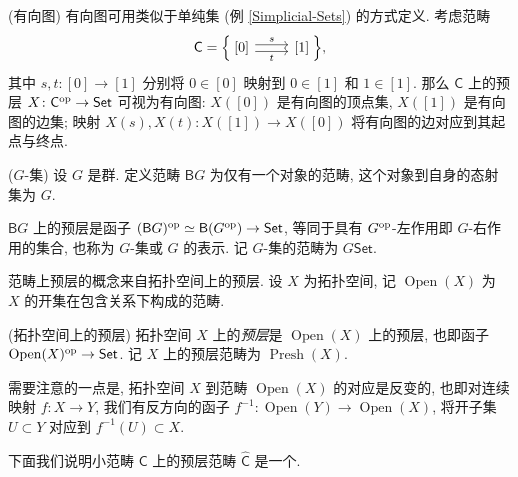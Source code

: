 \begin{example}
    {(有向图)}
    有向图可用类似于单纯集 (例 \ref{Simplicial-Sets}) 的方式定义.
    考虑范畴
    $$
    \mathsf C=
    \Big\{\!
    \begin{tikzcd}[ampersand replacement=\&]
	{[0]} \& {[1]}
	\arrow["s", shift left, from=1-1, to=1-2]
	\arrow["t"', shift right, from=1-1, to=1-2]
    \end{tikzcd}
    \!\Big\},
    $$
    其中 $s,t\colon [0]\to [1]$
    分别将 $0\in [0]$ 映射到 $0\in [1]$ 和 $1\in [1]$.
    那么 $\mathsf C$ 上的预层 $X\colon \mathsf C^{\text{op}}\to\mathsf {Set}$ 可视为有向图:
    $X([0])$ 是有向图的顶点集, $X([1])$ 是有向图的边集;
    映射 $X(s),X(t)\colon X([1])\to X([0])$ 将有向图的边对应到其起点与终点.
\end{example}

\begin{example}
    [label={G-set-presheaf-category}]
    {($G$-集)}
    设 $G$ 是群. 定义范畴 $\mathsf BG$ 为仅有一个对象的范畴,
    这个对象到自身的态射集为 $G$.

    $\mathsf BG$ 上的预层是函子 $(\mathsf B G)^{\text{op}} \simeq \mathsf B(G^{\text{op}}) \to \mathsf {Set}$, 等同于具有 $G^{\text{op}}$-左作用即 $G$-右作用的集合, 也称为 $G$-集或 $G$ 的表示. 记 $G$-集的范畴为 $G\mathsf {Set}$.
\end{example}


范畴上预层的概念来自拓扑空间上的预层.
设 $X$ 为拓扑空间, 记 $\operatorname{Open}(X)$ 为 $X$ 的开集在包含关系下构成的范畴.

\begin{definition}
    {(拓扑空间上的预层)}
    拓扑空间 $X$ 上的\emph{预层}是 $\operatorname{Open}(X)$ 上的预层, 也即函子 $\operatorname{Open}(X)^{\text{op}} \to \mathsf {Set}$.
    记 $X$ 上的预层范畴为 $\operatorname{Presh}(X)$.
\end{definition}

\begin{remark}
    {}
    需要注意的一点是, 拓扑空间 $X$ 到范畴 $\operatorname{Open}(X)$ 的对应是反变的, 也即对连续映射 $f\colon X \to Y$, 我们有反方向的函子 $f^{-1}\colon \operatorname{Open}(Y) \to \operatorname{Open}(X)$, 将开子集 $U\subset Y$ 对应到 $f^{-1}(U)\subset X$.
\end{remark}

下面我们说明小范畴 $\mathsf C$ 上的预层范畴 $\widehat {\mathsf C}$ 是一个\topos{}.

